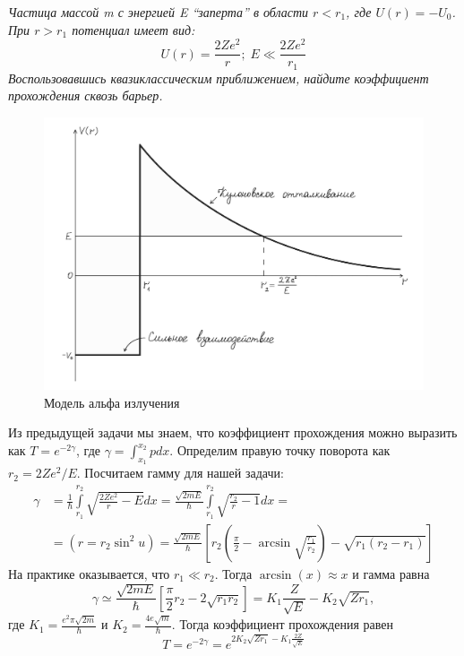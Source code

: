 \begin{center}
\textit{Частица массой m с энергией E ``заперта'' в области $r<r_1$, где $U(r) = -U_0$. При $r > r_1$ потенциал имеет вид:}
\[
U(r) = \frac{2Ze^2}{r}; \; E \ll \frac{2Ze^2}{r_1}
\]
\textit{Воспользовавшись квазиклассическим приближением, найдите коэффициент прохождения сквозь барьер.}
\end{center}

\begin{figure}[h!]
\centering
\includegraphics[scale=0.2]{appendix/images/alpha-decay.jpg}
\caption{Модель альфа излучения}
\label{fig C.3}
\end{figure}

Из предыдущей задачи мы знаем, что коэффициент прохождения можно выразить как $T = e^{-2\gamma}$, где $\gamma = \int_{x_1}^{x_2}p dx$. Определим правую точку поворота как $r_2 = 2Ze^2/E$. Посчитаем гамму для нашей задачи:
\begin{align*}
    \gamma & = \frac{1}{\hbar}\int\limits_{r_1}^{r_2}\sqrt{\frac{2Ze^2}{r} - E}dx = \frac{\sqrt{2mE}}{\hbar} \int\limits_{r_1}^{r_2} \sqrt{\frac{r_2}{r} - 1}dx = \\
    &= (r = r_2\sin^2 u) = \frac{\sqrt{2mE}}{\hbar}\left[ r_2\left( \frac{\pi}{2} - \arcsin\sqrt{\frac{r_1}{r_2}} \right) - \sqrt{r_1 (r_2 - r_1)}\right]
\end{align*}
На практике оказывается, что $r_1 \ll r_2$. Тогда $\arcsin (x)\approx x$ и гамма равна
\[
\gamma \simeq \frac{\sqrt{2mE}}{\hbar}\left[ \frac{\pi}{2}r_2 - 2\sqrt{r_1 r_2} \right] = K_1\frac{Z}{\sqrt{E}} - K_2\sqrt{Zr_1},
\]
где $K_1 = \frac{e^2\pi\sqrt{2m}}{\hbar}$ и $K_2 = \frac{4e\sqrt{m}}{\hbar}$. Тогда коэффициент прохождения равен
\[
T = e^{-2\gamma} = e^{2K_2\sqrt{Zr_1} - K_1\frac{2Z}{\sqrt{E}}}
\]
